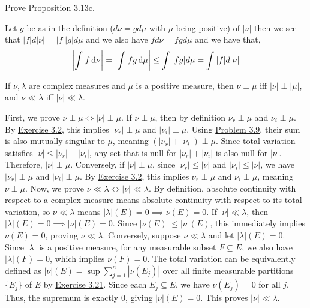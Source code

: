 \documentclass[12pt,a4paper]{article}
\begin{document}
\begin{problem}\label{prob:3-18}
Prove Proposition 3.13c.
\end{problem}
\begin{solution}
Let $g$ be as in the definition ($d\nu=gd\mu$ with $\mu$ being positive) of $|\nu|$ then we see that $|f|d|\nu|=|f||g|d\mu$ and we also have $fd\nu=fgd\mu$ and we have that,
\[
    \qty| \int_{}^{}f\,\mathrm{d}\nu|=\qty| \int_{}^{}fg\,\mathrm{d}\mu|\leq\int|fg|d\mu=\int|f|d|\nu|
\]
\end{solution}
\begin{problem}\label{prob:3-19}
If $\nu, \lambda$ are complex measures and $\mu$ is a positive measure, then $\nu\perp\mu$ iff $|\nu|\perp|\mu|$, and $\nu\ll\lambda$ iff $|\nu|\ll\lambda$.
\end{problem}
\begin{solution}
    First, we prove $\nu\perp\mu \iff |\nu|\perp\mu$. 
    If $\nu\perp\mu$, then by definition $\nu_r\perp\mu$ and $\nu_i\perp\mu$. By \hyperref[prob:3-2]{Exercise 3.2}, this implies $|\nu_r|\perp\mu$ and $|\nu_i|\perp\mu$. Using \hyperref[prob:3-9]{Problem 3.9}, their sum is also mutually singular to $\mu$, meaning $(|\nu_r|+|\nu_i|)\perp\mu$. Since total variation satisfies $|\nu| \leq |\nu_r|+|\nu_i|$, any set that is null for $|\nu_r|+|\nu_i|$ is also null for $|\nu|$. Therefore, $|\nu|\perp\mu$.
    Conversely, if $|\nu|\perp\mu$, since $|\nu_r| \leq |\nu|$ and $|\nu_i| \leq |\nu|$, we have $|\nu_r|\perp\mu$ and $|\nu_i|\perp\mu$. By \hyperref[prob:3-2]{Exercise 3.2}, this implies $\nu_r\perp\mu$ and $\nu_i\perp\mu$, meaning $\nu\perp\mu$. 
    Now, we prove $\nu\ll\lambda \iff |\nu|\ll\lambda$. 
    By definition, absolute continuity with respect to a complex measure means absolute continuity with respect to its total variation, so $\nu\ll\lambda$ means $|\lambda|(E)=0 \implies \nu(E)=0$.
    If $|\nu|\ll\lambda$, then $|\lambda|(E)=0 \implies |\nu|(E)=0$. Since $|\nu(E)| \leq |\nu|(E)$, this immediately implies $\nu(E)=0$, proving $\nu\ll\lambda$.
    Conversely, suppose $\nu\ll\lambda$ and let $|\lambda|(E)=0$. Since $|\lambda|$ is a positive measure, for any measurable subset $F \subseteq E$, we also have $|\lambda|(F)=0$, which implies $\nu(F)=0$. The total variation can be equivalently defined as $|\nu|(E) = \sup \sum_{j=1}^n |\nu(E_j)|$ over all finite measurable partitions $\{E_j\}$ of $E$ by \hyperref[prob:3-21]{Exercise 3.21}. Since each $E_j \subseteq E$, we have $\nu(E_j)=0$ for all $j$. Thus, the supremum is exactly $0$, giving $|\nu|(E)=0$. This proves $|\nu|\ll\lambda$.
\end{solution}
\end{document}
